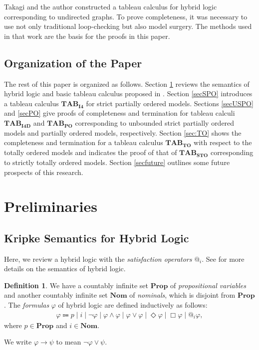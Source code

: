 \documentclass{article}
\theoremstyle{definition}
\newtheorem{definition}{Definition}[section]
\newcommand{\Prop}{\mathbf{Prop}}
\newcommand{\Nom}{\mathbf{Nom}}
\newcommand{\Dia}{\Diamond}
\newcommand{\tableauIF}{\mathbf{TAB}_{\mathbf{I4}}}
\newcommand{\tableauIFD}{\mathbf{TAB}_{\mathbf{I4D}}}
\newcommand{\tableauPO}{\mathbf{TAB}_{\textbf{PO}}}
\newcommand{\tableauIFT}{\mathbf{TAB}_{\textbf{STO}}}
\newcommand{\tableauTO}{\mathbf{TAB}_{\textbf{TO}}}
\begin{document}
Takagi and the author \cite{nishimura2025} constructed a tableau calculus for hybrid logic corresponding to undirected graphs. To prove completeness, it was necessary to use not only traditional loop-checking but also model surgery. The methods used in that work are the basis for the proofs in this paper.

\subsection{Organization of the Paper}
The rest of this paper is organized as follows. Section \ref{secpreliminaries} reviews the semantics of hybrid logic and basic tableau calculus proposed in \cite{bolander2007}. Section \ref{secSPO} introduces a tableau calculus $\tableauIF$ for strict partially ordered models. Sections \ref{secUSPO} and \ref{secPO} give proofs of completeness and termination for tableau calculi $\tableauIFD$ and $\tableauPO$ corresponding to unbounded strict partially ordered models and partially ordered models, respectively. Section \ref{sec:TO} shows the completeness and termination for a tableau calculus $\tableauTO$ with respect to the totally ordered models and indicates the proof of that of $\tableauIFT$ corresponding to strictly totally ordered models. Section \ref{secfuture} outlines some future prospects of this research.

\section{Preliminaries}
\label{secpreliminaries}

\subsection{Kripke Semantics for Hybrid Logic}
\label{secsemantics}

Here, we review a hybrid logic with the \emph{satisfaction operators} $@_i$. See \cite{brauner2011} for more details on the semantics of hybrid logic.

\begin{definition}
  We have a countably infinite set $\Prop$ of \emph{propositional variables} and another countably infinite set $\Nom$ of \emph{nominals}, which is disjoint from $\Prop$. The \emph{formulas} $\varphi$ of hybrid logic are defined inductively as follows:
  \begin{align*}
    \varphi \Coloneqq p \mid i \mid \neg \varphi \mid \varphi \land \varphi \mid \varphi \lor \varphi \mid \Dia \varphi \mid \Box \varphi \mid @_i \varphi,
  \end{align*}
  where $p \in \Prop$ and $i \in \Nom$.

  We write $\varphi \rightarrow \psi$ to mean $\neg \varphi \lor \psi$.
\end{definition}
\end{document}
